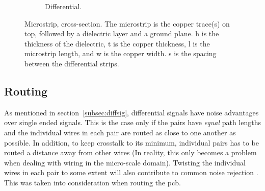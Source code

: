 \documentclass[main.tex]{subfiles}
\begin{document}
\begin{figure}[H]
\begin{subfigure}[t]{0.45\textwidth}
{
  }
     \caption{Differential.}
  \end{subfigure}
      \caption{Microstrip, cross-section. The microstrip is the copper trace(s) on top, followed by a dielectric layer and a ground plane. h is the thickness of the dielectric, t is the copper thickness, l is the microstrip length, and w is the copper width. s is the spacing between the differential strips.}
    \label{fig:microstrip}
\end{figure}

\subsection{Routing}

As mentioned in section~\ref{subsec:diffsig}, differential signals have noise advantages over single ended signals. This is the case only if the pairs have \textit{equal} path lengths and the individual wires in each pair are routed as close to one another as possible. In addition, to keep crosstalk to its minimum, individual pairs has to be routed a distance away from other wires (In reality, this only becomes a problem when dealing with wiring in the micro-scale domain). Twisting the individual wires in each pair to some extent will also contribute to common noise rejection \cite{weste11}.
This was taken into consideration when routing the \gls{pcb}. 
\end{document}
